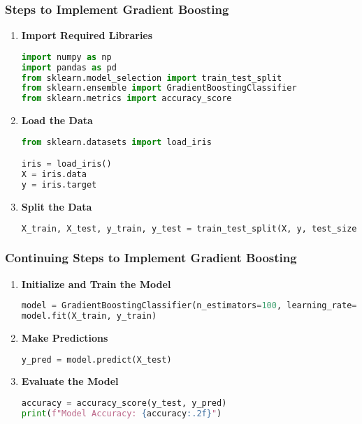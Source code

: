 \documentclass[aspectratio=169]{beamer}
\begin{document}
\begin{frame}[fragile]
    \frametitle{Steps to Implement Gradient Boosting}
    \begin{enumerate}
        \item \textbf{Import Required Libraries}
        \begin{lstlisting}[language=Python]
import numpy as np
import pandas as pd
from sklearn.model_selection import train_test_split
from sklearn.ensemble import GradientBoostingClassifier
from sklearn.metrics import accuracy_score
        \end{lstlisting}

        \item \textbf{Load the Data}
        \begin{lstlisting}[language=Python]
from sklearn.datasets import load_iris

iris = load_iris()
X = iris.data
y = iris.target
        \end{lstlisting}

        \item \textbf{Split the Data}
        \begin{lstlisting}[language=Python]
X_train, X_test, y_train, y_test = train_test_split(X, y, test_size=0.2, random_state=42)
        \end{lstlisting}
    \end{enumerate}
\end{frame}

\begin{frame}[fragile]
    \frametitle{Continuing Steps to Implement Gradient Boosting}
    \begin{enumerate}[resume]
        \item \textbf{Initialize and Train the Model}
        \begin{lstlisting}[language=Python]
model = GradientBoostingClassifier(n_estimators=100, learning_rate=0.1, max_depth=3)
model.fit(X_train, y_train)
        \end{lstlisting}

        \item \textbf{Make Predictions}
        \begin{lstlisting}[language=Python]
y_pred = model.predict(X_test)
        \end{lstlisting}

        \item \textbf{Evaluate the Model}
        \begin{lstlisting}[language=Python]
accuracy = accuracy_score(y_test, y_pred)
print(f"Model Accuracy: {accuracy:.2f}")
        \end{lstlisting}
    \end{enumerate}
\end{frame}
\end{document}
